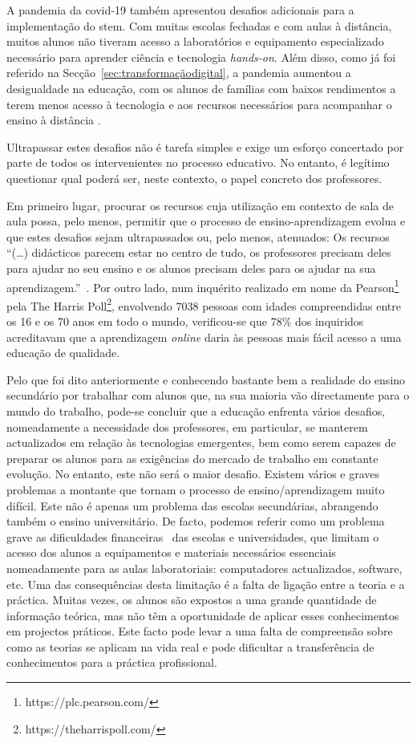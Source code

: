 A pandemia da \acrshort{covid-19} também apresentou desafios adicionais para a implementação do \acrshort{stem}. Com muitas escolas fechadas e com aulas à distância, muitos alunos não tiveram acesso a laboratórios e equipamento especializado necessário para aprender ciência e tecnologia \textit{hands-on}. Além disso, como já foi referido na Secção~\ref{sec:transformaçãodigital}, a pandemia aumentou a desigualdade na educação, com os alunos de famílias com baixos rendimentos a terem menos acesso à tecnologia e aos recursos necessários para acompanhar o ensino à distância \cite{desigualdadespandemia, efeitospandemiadigital}.

Ultrapassar estes desafios não é tarefa simples e exige um esforço concertado por parte de todos os intervenientes no processo educativo. No entanto, é legítimo questionar qual poderá ser, neste contexto, o papel concreto dos professores.

Em primeiro lugar, procurar os recursos cuja utilização em contexto de sala de aula possa, pelo menos, permitir que o processo de ensino-aprendizagem evolua e que estes desafios sejam ultrapassados ou, pelo menos, atenuados: Os recursos ``(\ldots) didácticos parecem estar no centro de tudo, os professores precisam deles para ajudar no seu ensino e os alunos precisam deles para os ajudar na sua aprendizagem.''~\cite{virtuallabng}. Por outro lado, num inquérito \cite{pearson} realizado em nome da Pearson\footnote{https://plc.pearson.com/} pela The Harris Poll\footnote{https://theharrispoll.com/}, envolvendo 7038 pessoas com idades compreendidas entre os 16 e os 70 anos em todo o mundo, verificou-se que 78\% dos inquiridos acreditavam que a aprendizagem \textit{online} daria às pessoas mais fácil acesso a uma educação de qualidade. 

Pelo que foi dito anteriormente e conhecendo bastante bem a realidade do ensino secundário por trabalhar com alunos que, na sua maioria vão directamente para o mundo do trabalho, pode-se concluir que a educação enfrenta vários desafios, nomeadamente a necessidade dos professores, em particular, se manterem actualizados em relação às tecnologias emergentes, bem como serem capazes de preparar os alunos para as exigências do mercado de trabalho em constante evolução. No entanto, este não será o maior desafio. Existem vários e graves problemas a montante que tornam o processo de ensino/aprendizagem muito difícil. Este não é apenas um problema das escolas secundárias, abrangendo também o ensino universitário. De facto, podemos referir como um problema grave as dificuldades financeiras~\cite{dificuldadesfinanciamento, Financiamentoprofissional, Educacaofinanciamento} das escolas e universidades, que limitam o acesso dos alunos a equipamentos e materiais necessários essenciais nomeadamente para as aulas laboratoriais: computadores actualizados, software, etc. Uma das consequências desta limitação é a falta de ligação entre a teoria e a práctica. Muitas vezes, os alunos são expostos a uma grande quantidade de informação teórica, mas não têm a oportunidade de aplicar esses conhecimentos em projectos práticos. Este facto pode levar a uma falta de compreensão sobre como as teorias se aplicam na vida real e pode dificultar a transferência de conhecimentos para a práctica profissional.

